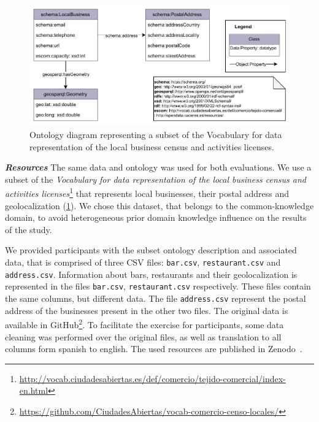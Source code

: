\begin{figure}[!t]
\centering
\includegraphics[width=\linewidth]{figures/chp5-1_us_onto.pdf}
\caption[Ontology diagram for the user study exercise of Mapeathor]{Ontology diagram representing a subset of the Vocabulary for data representation of the local business census and activities licenses.}
\label{fig:chp5-1_us_onto}
\end{figure}

\noindent\textit{\textbf{Resources}}
The same data and ontology was used for both evaluations. We use a subset of the \textit{Vocabulary for data representation of the local business census and activities licenses}\footnote{\url{http://vocab.ciudadesabiertas.es/def/comercio/tejido-comercial/index-en.html}} that represents local businesses, their postal address and geolocalization (\cref{fig:chp5-1_us_onto}). 
We chose this dataset, that belongs to the common-knowledge domain, to avoid heterogeneous prior domain knowledge influence on the results of the study.

We provided participants with the subset ontology description and associated data, that is comprised of three CSV files: \texttt{bar.csv}, \texttt{restaurant.csv} and \texttt{address.csv}. Information about bars, restaurants and their geolocalization is represented in the files \texttt{bar.csv}, \texttt{restaurant.csv} respectively. 
These files contain the same columns, but different data. The file \texttt{address.csv} represent the postal address of the businesses present in the other two files. 
The original data is available in GitHub\footnote{\url{https://github.com/CiudadesAbiertas/vocab-comercio-censo-locales/}}. 
To facilitate the exercise for participants, some data cleaning was performed over the original files, as well as translation to all columns form spanish to english. The used resources are published in Zenodo~\cite{iglesias-molina_2022_8154522}.



